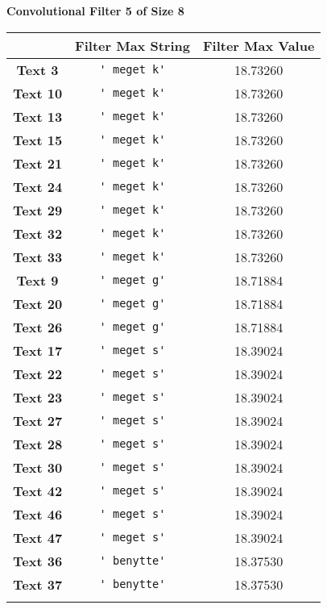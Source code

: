 \begin{table}
    \centering
    \textbf{Convolutional Filter 5 of Size 8}\par\medskip
    \begin{tabular}{c|cc}
        & \textbf{Filter Max String} & \textbf{Filter Max Value} \\ \hline
        \textbf{Text 3} & \verb{' meget k'{ & 18.73260 \\
        \textbf{Text 10} & \verb{' meget k'{ & 18.73260 \\
        \textbf{Text 13} & \verb{' meget k'{ & 18.73260 \\
        \textbf{Text 15} & \verb{' meget k'{ & 18.73260 \\
        \textbf{Text 21} & \verb{' meget k'{ & 18.73260 \\
        \textbf{Text 24} & \verb{' meget k'{ & 18.73260 \\
        \textbf{Text 29} & \verb{' meget k'{ & 18.73260 \\
        \textbf{Text 32} & \verb{' meget k'{ & 18.73260 \\
        \textbf{Text 33} & \verb{' meget k'{ & 18.73260 \\
        \textbf{Text 9} & \verb{' meget g'{ & 18.71884 \\
        \textbf{Text 20} & \verb{' meget g'{ & 18.71884 \\
        \textbf{Text 26} & \verb{' meget g'{ & 18.71884 \\
        \textbf{Text 17} & \verb{' meget s'{ & 18.39024 \\
        \textbf{Text 22} & \verb{' meget s'{ & 18.39024 \\
        \textbf{Text 23} & \verb{' meget s'{ & 18.39024 \\
        \textbf{Text 27} & \verb{' meget s'{ & 18.39024 \\
        \textbf{Text 28} & \verb{' meget s'{ & 18.39024 \\
        \textbf{Text 30} & \verb{' meget s'{ & 18.39024 \\
        \textbf{Text 42} & \verb{' meget s'{ & 18.39024 \\
        \textbf{Text 46} & \verb{' meget s'{ & 18.39024 \\
        \textbf{Text 47} & \verb{' meget s'{ & 18.39024 \\
        \textbf{Text 36} & \verb{' benytte'{ & 18.37530 \\
        \textbf{Text 37} & \verb{' benytte'{ & 18.37530 \\
}}}}}}}}}}}}}}}}}}}}}}}
\end{tabular}
\end{table}
